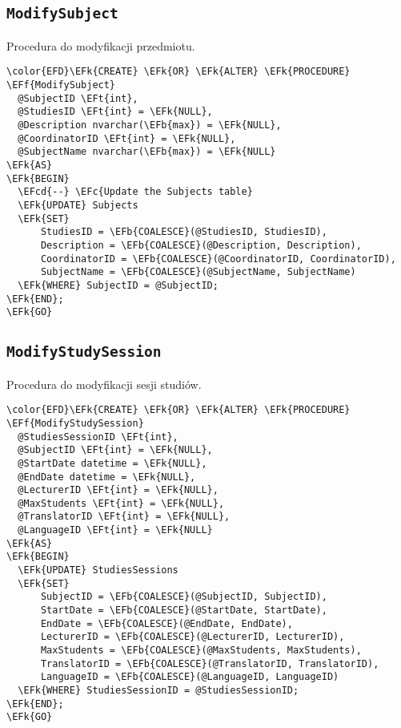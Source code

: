 \documentclass[11pt]{article}
\newcommand{\EFc}[1]{\textcolor{EFc}{\textit{#1}}} %
\newcommand{\EFcd}[1]{\textcolor{EFcd}{\textit{#1}}} %
\newcommand{\EFk}[1]{\textcolor{EFk}{\textbf{#1}}} %
\newcommand{\EFb}[1]{\textcolor{EFb}{\textbf{#1}}} %
\newcommand{\EFf}[1]{\textcolor{EFf}{#1}} %
\newcommand{\EFt}[1]{\textcolor{EFt}{\textbf{#1}}} %
\begin{document}
\subsection{\texttt{ModifySubject}}
\label{sec:orga27cadb}
Procedura do modyfikacji przedmiotu.
\begin{Code}
\begin{Verbatim}
\color{EFD}\EFk{CREATE} \EFk{OR} \EFk{ALTER} \EFk{PROCEDURE} \EFf{ModifySubject}
  @SubjectID \EFt{int},
  @StudiesID \EFt{int} = \EFk{NULL},
  @Description nvarchar(\EFb{max}) = \EFk{NULL},
  @CoordinatorID \EFt{int} = \EFk{NULL},
  @SubjectName nvarchar(\EFb{max}) = \EFk{NULL}
\EFk{AS}
\EFk{BEGIN}
  \EFcd{--} \EFc{Update the Subjects table}
  \EFk{UPDATE} Subjects
  \EFk{SET} 
      StudiesID = \EFb{COALESCE}(@StudiesID, StudiesID),
      Description = \EFb{COALESCE}(@Description, Description),
      CoordinatorID = \EFb{COALESCE}(@CoordinatorID, CoordinatorID),
      SubjectName = \EFb{COALESCE}(@SubjectName, SubjectName)
  \EFk{WHERE} SubjectID = @SubjectID;
\EFk{END};
\EFk{GO}
\end{Verbatim}
\end{Code}
\subsection{\texttt{ModifyStudySession}}
\label{sec:org7e13892}
Procedura do modyfikacji sesji studiów.
\begin{Code}
\begin{Verbatim}
\color{EFD}\EFk{CREATE} \EFk{OR} \EFk{ALTER} \EFk{PROCEDURE} \EFf{ModifyStudySession}
  @StudiesSessionID \EFt{int},
  @SubjectID \EFt{int} = \EFk{NULL},
  @StartDate datetime = \EFk{NULL},
  @EndDate datetime = \EFk{NULL},
  @LecturerID \EFt{int} = \EFk{NULL},
  @MaxStudents \EFt{int} = \EFk{NULL},
  @TranslatorID \EFt{int} = \EFk{NULL},
  @LanguageID \EFt{int} = \EFk{NULL}
\EFk{AS}
\EFk{BEGIN}
  \EFk{UPDATE} StudiesSessions
  \EFk{SET} 
      SubjectID = \EFb{COALESCE}(@SubjectID, SubjectID),
      StartDate = \EFb{COALESCE}(@StartDate, StartDate),
      EndDate = \EFb{COALESCE}(@EndDate, EndDate),
      LecturerID = \EFb{COALESCE}(@LecturerID, LecturerID),
      MaxStudents = \EFb{COALESCE}(@MaxStudents, MaxStudents),
      TranslatorID = \EFb{COALESCE}(@TranslatorID, TranslatorID),
      LanguageID = \EFb{COALESCE}(@LanguageID, LanguageID)
  \EFk{WHERE} StudiesSessionID = @StudiesSessionID;
\EFk{END};
\EFk{GO}
\end{Verbatim}
\end{Code}
\end{document}
